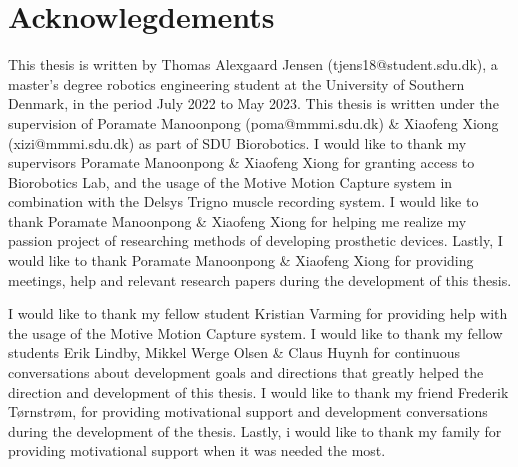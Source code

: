 \documentclass[../main.tex]{subfiles}
\begin{document}
\section*{Acknowlegdements}

This thesis is written by Thomas Alexgaard Jensen (tjens18@student.sdu.dk), a master's degree robotics engineering student at the University of Southern Denmark, in the period July 2022 to May 2023.
This thesis is written under the supervision of Poramate Manoonpong (poma@mmmi.sdu.dk) \& Xiaofeng Xiong (xizi@mmmi.sdu.dk) as part of SDU Biorobotics.
I would like to thank my supervisors Poramate Manoonpong \& Xiaofeng Xiong for granting access to Biorobotics Lab, and the usage of the Motive Motion Capture system in combination with the Delsys Trigno muscle recording system.
I would like to thank Poramate Manoonpong \& Xiaofeng Xiong for helping me realize my passion project of researching methods of developing prosthetic devices.
Lastly, I would like to thank Poramate Manoonpong \& Xiaofeng Xiong for providing meetings, help and relevant research papers during the development of this thesis.

I would like to thank my fellow student Kristian Varming for providing help with the usage of the Motive Motion Capture system.
I would like to thank my fellow students Erik Lindby, Mikkel Werge Olsen \& Claus Huynh for continuous conversations about development goals and directions that greatly helped the direction and development of this thesis.
I would like to thank my friend Frederik Tørnstrøm, for providing motivational support and development conversations during the development of the thesis.
Lastly, i would like to thank my family for providing motivational support when it was needed the most.
\end{document}
